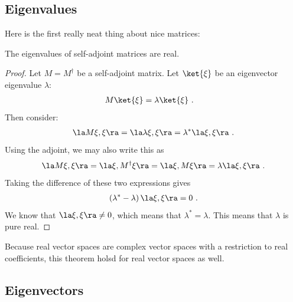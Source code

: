 \subsection{Eigenvalues}

Here is the first really neat thing about nice matrices:
\begin{theorem}
The eigenvalues of self-adjoint matrices are real.
\end{theorem}
\begin{proof}
Let $M=M^\dag$ be a self-adjoint matrix. Let $\ket{\xi}$ be  an eigenvector eigenvalue $\lambda$:
\begin{align}
    M\ket{\xi} &= \lambda\ket{\xi} 
    \ .
\end{align}
Then consider:
\begin{align}
    \la M \xi, \xi \ra 
    = 
    \la \lambda \xi, \xi \ra
    = 
    \lambda^* \la \xi, \xi \ra \ .
\end{align}
Using the adjoint, we may also write this as
\begin{align}
    \la M \xi, \xi \ra 
    = 
    \la \xi, M^\dag \xi \ra
    =
    \la \xi, M \xi \ra
    = 
    \lambda \la \xi, \xi \ra \ .
\end{align}
Taking the difference of these two expressions gives
\begin{align}
    \left(\lambda^*-\lambda\right) \la \xi, \xi \ra  = 0 \ .
\end{align}
We know that $ \la \xi, \xi \ra\neq 0$, which means that $\lambda^* = \lambda$. This means that $\lambda$ is pure real. 
\end{proof}
Because real vector spaces are complex vector spaces with  a restriction to real coefficients, this theorem holsd for real vector spaces as well. 

\subsection{Eigenvectors}

